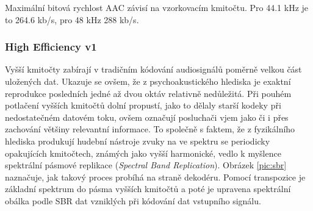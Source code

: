 Maximální bitová rychlost AAC závisí na vzorkovacím kmitočtu. Pro 44.1 kHz je to 264.6 kb/s, pro 48 kHz 288 kb/s. \cite{iso:aac}


\subsubsection{High Efficiency v1}

Vyšší kmitočty zabírají v tradičním kódování audiosignálů poměrně velkou část uložených dat. Ukazuje se ovšem, že z psychoakustického hlediska je exaktní reprodukce posledních jedné až dvou oktáv relativně nedůležitá. Při pouhém potlačení vyšších kmitočtů dolní propustí, jako to dělaly starší kodeky při nedostatečném datovém toku, ovšem označují posluchači vjem jako  či  i přes zachování většiny relevantní informace. To společně s faktem, že z fyzikálního hlediska produkují hudební nástroje zvuky na ve spektru se periodicky opakujících kmitočtech, známých jako vyšší harmonické, vedlo k myšlence spektrální pásmové replikace (\textit{Spectral Band Replication}). Obrázek \ref{pic:sbr} naznačuje, jak takový proces probíhá na straně dekodéru. Pomocí transpozice je základní spektrum  do pásma vyšších kmitočtů a poté je upravena spektrální obálka podle SBR dat vzniklých při kódování dat vstupního signálu. 


